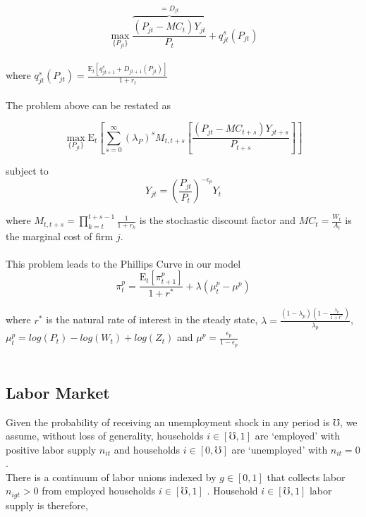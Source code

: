 \documentclass[titlepage]{\econtex}\providecommand{\texname}{BufferStockTheory}
\begin{document}
 $$\max_{\{P_{jt}\}} \overbrace{\frac{(P_{jt} - MC_{t})Y_{jt}}{P_{t}}}^{=D_{jt}} + q^{s}_{jt}\left(P_{jt}\right) $$ \\
 
where  $q^{s}_{jt}\left(P_{jt}\right) = \frac{\mathrm{E}_{t}\left[q^{s}_{jt+1} +D_{jt+1}\left(P_{jt}\right)\right]}{1+r_{t}}$ \\ \\

The problem above can be restated as 
 
 $$\max_{\{P_{jt}\}} \mathrm{E}_{t}\left[\sum_{s=0}^{\infty} (\lambda_{P}) ^{s} M_{t,t+s} \left[ \frac{(P_{jt} - MC_{t+s})Y_{jt+s}}{P_{t+s}}\right]\right]$$
 
subject to $$Y_{jt} = \left(\frac {P_{jt}}{P_{t}}\right)^{- \epsilon_{p}} Y_{t}$$
 
where $M_{t, t+s} = \prod_{k=t}^{t+s-1} \frac{1}{1+r_{k}}$ is the stochastic discount factor and $MC_{t} = \frac{W_{t}}{A_{t}}$ is the marginal cost of firm $j$.  \\ \\


This problem leads to the Phillips Curve in our model \\ 

$$ \pi_{t}^{p} = \frac{\mathrm{E}_{t}[\pi_{t+1}^{p}]}{1+r^{*}} + \lambda (\mu_{t}^{p} -\mu^{p})$$

where $r^{*}$ is the natural rate of interest in the steady state, $\lambda = \frac{(1-\lambda_{p})(1-\frac{\lambda_{p}}{1+r^{*}})}{\lambda_{p}}$,  $ \mu_{t}^{p} = log(P_{t}) - log(W_{t}) + log(Z_{t})$ and $\mu^{p} = \frac{\epsilon_{p}}{1-\epsilon_{p}}$ \\ \\



\hypertarget{Labor Market}{}
\subsection{Labor Market}

Given the probability of receiving an unemployment shock in any period is $\mho$, we assume, without loss of generality, households $i \in [\mho,1]$ are `employed'  with positive labor supply $n_{it}$ and households $i \in [0, \mho]$  are `unemployed' with $n_{it} = 0$. \\

There is a continuum of labor unions indexed by $g \in [0,1]$ that collects labor $n_{igt} > 0$ from employed households $i \in [\mho,1]$ . Household $i \in [\mho,1]$ labor supply is therefore, 
\end{document}
